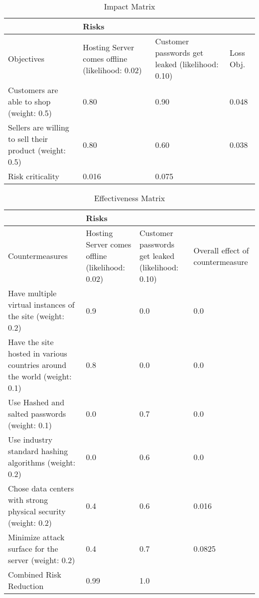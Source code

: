 \begin{center}
\begin{table}[!ht]
  \begin{tabularx}{\textwidth}{|X|X|X|X|}
    \hline
    &\multicolumn{3}{X|}{Risks}\\
    \hline
    Objectives&Hosting Server comes offline (likelihood: 0.02)&Customer passwords get leaked (likelihood: 0.10)&Loss Obj.\\
    \hline
    Customers are able to shop (weight: 0.5)&0.80&0.90&0.048\\
    \hline
    Sellers are willing to sell their product (weight: 0.5)&0.80&0.60&0.038\\
    \hline
    Risk criticality&0.016&0.075&\\
    \hline
  \end{tabularx}
  \caption{Impact Matrix}
  \label{tab:impact-matrix}
\end{table}
\begin{table}[!ht]
  \begin{tabularx}{\textwidth}{|X|X|X|X|}
    \hline
    &\multicolumn{3}{X|}{Risks}\\
    \hline
    Countermeasures&Hosting Server comes offline (likelihood: 0.02)&Customer passwords get leaked (likelihood: 0.10)&Overall effect of countermeasure\\
    \hline
    Have multiple virtual instances of the site (weight: 0.2)&0.9&0.0&0.0\\
    \hline
    Have the site hosted in various countries around the world (weight: 0.1)&0.8&0.0&0.0\\
    \hline
    Use Hashed and salted passwords (weight: 0.1)&0.0&0.7&0.0\\
    \hline
    Use industry standard hashing algorithms (weight: 0.2)&0.0&0.6&0.0\\
    \hline
    Chose data centers with strong physical security (weight: 0.2)&0.4&0.6&0.016\\
    \hline
    Minimize attack surface for the server (weight: 0.2)&0.4&0.7&0.0825\\
    \hline
    Combined Risk Reduction&0.99&1.0&\\
    \hline
  \end{tabularx}
  \caption{Effectiveness Matrix}
  \label{tab:effectiveness-matrix}
\end{table}
\end{center}

